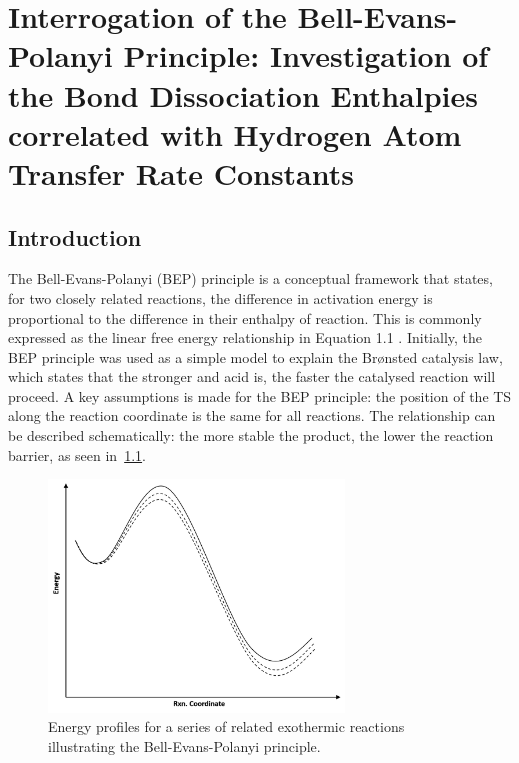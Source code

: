 
\chapter{Interrogation of the Bell-Evans-Polanyi Principle: Investigation of the Bond Dissociation Enthalpies correlated with Hydrogen Atom Transfer Rate Constants}
\label{ch:bde}

\section{Introduction}

The Bell-Evans-Polanyi (BEP) principle is a conceptual framework that states, for two closely related reactions, the difference in activation energy is proportional to the difference in their enthalpy of reaction.\cite{Bell1936,Evans1938,Dill2003} This is commonly expressed as the linear free energy relationship in Equation 1.1 . Initially, the BEP principle was used as a simple model to explain the Br{\o}nsted catalysis law, which states that the stronger and acid is, the faster the catalysed reaction will proceed.\cite{Bronsted1924} A key assumptions is made for the BEP principle: the position of the TS along the reaction coordinate is the same for all reactions. The relationship can be described schematically: the more stable the product, the lower the reaction barrier, as seen in~\ref{fig:bep}.

\begin{figure}[htb]
  \centering
  \includegraphics[width=0.7\textwidth]{figures/bep}
  \caption{Energy profiles for a series of related exothermic reactions illustrating the Bell-Evans-Polanyi principle.}
\label{fig:bep}
\end{figure}

